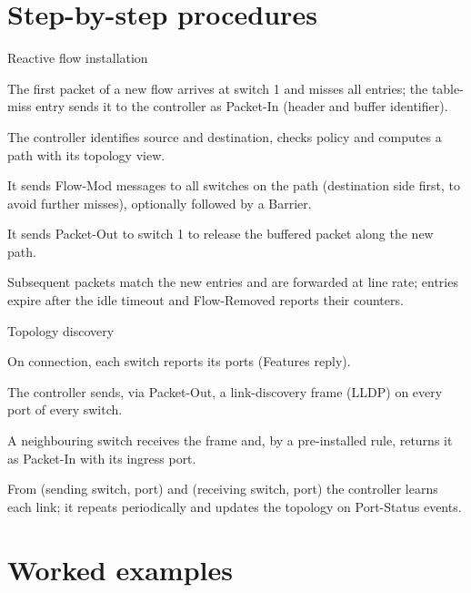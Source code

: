 \documentclass[11pt,a4paper]{article}
\begin{document}
\section{Step-by-step procedures}

\begin{procedurebox}{Reactive flow installation}\label{proc:reactive}
\begin{steps}
  \item The first packet of a new flow arrives at switch 1 and misses all entries; the table-miss entry sends
        it to the controller as Packet-In (header and buffer identifier).
  \item The controller identifies source and destination, checks policy and computes a path with its topology
        view.
  \item It sends Flow-Mod messages to all switches on the path (destination side first, to avoid further
        misses), optionally followed by a Barrier.
  \item It sends Packet-Out to switch 1 to release the buffered packet along the new path.
  \item Subsequent packets match the new entries and are forwarded at line rate; entries expire after the idle
        timeout and Flow-Removed reports their counters.
\end{steps}
\end{procedurebox}

\begin{procedurebox}{Topology discovery}\label{proc:lldp}
\begin{steps}
  \item On connection, each switch reports its ports (Features reply).
  \item The controller sends, via Packet-Out, a link-discovery frame (LLDP) on every port of every switch.
  \item A neighbouring switch receives the frame and, by a pre-installed rule, returns it as Packet-In with its
        ingress port.
  \item From (sending switch, port) and (receiving switch, port) the controller learns each link; it repeats
        periodically and updates the topology on Port-Status events.
\end{steps}
\end{procedurebox}

\section{Worked examples}
\end{document}
